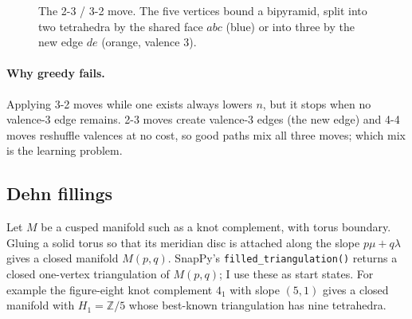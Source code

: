 \documentclass[10pt,a4paper]{article}
\begin{document}
\begin{figure}[!t]
\centering
{}
\caption{The 2-3 / 3-2 move. The five vertices bound a bipyramid, split into two tetrahedra by the shared face $abc$ (blue) or into three by the new edge $de$ (orange, valence 3).}
\label{fig:moves}
\end{figure}

\paragraph{Why greedy fails.} Applying 3-2 moves while one exists always lowers $n$, but it stops when no valence-3 edge remains. 2-3 moves create valence-3 edges (the new edge) and 4-4 moves reshuffle valences at no cost, so good paths mix all three moves; which mix is the learning problem.

\subsection{Dehn fillings}
Let $M$ be a cusped manifold such as a knot complement, with torus boundary. Gluing a solid torus so that its meridian disc is attached along the slope $p\mu+q\lambda$ gives a closed manifold $M(p,q)$.
SnapPy's \texttt{filled\_triangulation()} returns a closed one-vertex triangulation of $M(p,q)$; I use these as start states. For example the figure-eight knot complement $4_1$ with slope $(5,1)$ gives a closed manifold with $H_1=\mathbb Z/5$ whose best-known triangulation has nine tetrahedra.
\end{document}

